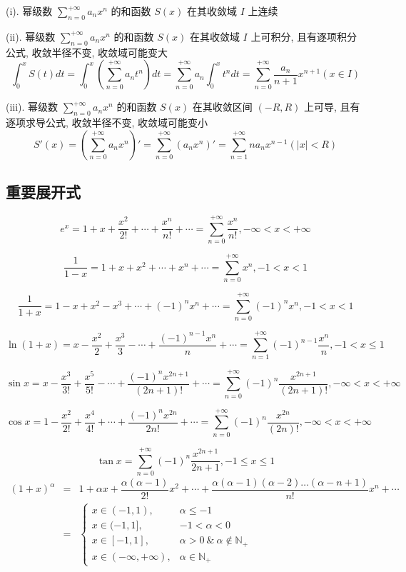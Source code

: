 \begin{corollary}
	
	(i). 幂级数 $\sum\limits_{n=0}^{+\infty}a_{n}x^{n}$ 的和函数 $S(x)$ 在其收敛域 $I$ 上连续

	(ii). 幂级数 $\sum\limits_{n=0}^{+\infty}a_{n}x^{n}$ 的和函数 $S(x)$ 在其收敛域 $I$ 上可积分, 且有逐项积分公式, 收敛半径不变, 收敛域可能变大 
	$$\int_{0}^{x}S(t)dt = \int_{0}^{x}\left(\sum\limits_{n=0}^{+\infty}a_{n}t^{n}\right)dt = \sum\limits_{n=0}^{+\infty}a_{n}\int_{0}^{x}t^{n}dt = \sum\limits_{n=0}^{+\infty}\dfrac{a_{n}}{n+1}x^{n+1}(x\in I)$$
	
	(iii). 幂级数 $\sum\limits_{n=0}^{+\infty}a_{n}x^{n}$ 的和函数 $S(x)$ 在其收敛区间 $(-R,R)$ 上可导, 且有逐项求导公式, 收敛半径不变, 收敛域可能变小 
	$$S'(x) = \left(\sum\limits_{n=0}^{+\infty}a_{n}x^{n}\right)' = \sum\limits_{n=0}^{+\infty}\left(a_{n}x^{n}\right)' = \sum\limits_{n=1}^{+\infty}na_{n}x^{n-1}(|x| < R)$$
\end{corollary}

\subsection{重要展开式}

\begin{theorem}\label{the: 重要幂级数展开式}
	$$e^{x}=1+x+\dfrac{x^2}{2!}+\cdots+\dfrac{x^n}{n!}+\cdots = 
	\sum\limits_{n=0}^{+\infty}\dfrac{x^{n}}{n!}, -\infty<x<+\infty$$

	$$\dfrac{1}{1-x}=1+x+x^2+\cdots+x^{n}+\cdots = 
	\sum\limits_{n=0}^{+\infty}x^{n}, -1<x<1$$

	$$\dfrac{1}{1+x}=1-x+x^2-x^3+\cdots+(-1)^{n}x^{n}+\cdots = 
	\sum\limits_{n=0}^{+\infty}(-1)^{n}x^{n},-1<x<1$$

	$$\ln(1+x)=x-\dfrac{x^2}{2}+\dfrac{x^3}{3}-\cdots + \dfrac{(-1)^{n-1}x^{n}}{n}+\cdots
	= \sum\limits_{n=1}^{+\infty}(-1)^{n-1}\dfrac{x^{n}}{n},-1<x\leq 1$$
	
	$$\sin x=x-\dfrac{x^3}{3!}+\dfrac{x^5}{5!}-\cdots+\dfrac{(-1)^{n}x^{2n+1}}{(2n+1)!}+\cdots=\sum\limits_{n=0}^{+\infty}(-1)^{n}\dfrac{x^{2n+1}}{(2n+1)!}, -\infty<x<+\infty$$
	
	$$\cos x=1-\dfrac{x^2}{2!}+\dfrac{x^4}{4!}+\cdots+\dfrac{(-1)^nx^{2n}}{2n!}+\cdots=\sum\limits_{n=0}^{+\infty}(-1)^{n}\dfrac{x^{2n}}{(2n)!}, -\infty<x<+\infty$$
	
	$$\tan x=\sum\limits_{n=0}^{+\infty}(-1)^{n}\dfrac{x^{2n+1}}{2n+1}, -1\leq x\leq 1 $$
	\begin{eqnarray*}
		(1+x)^{\alpha} & = & 1+\alpha x+\dfrac{\alpha (\alpha-1)}{2!}x^2+ \cdots + \dfrac{\alpha (\alpha-1)(\alpha-2)\dots(\alpha-n+1)}{n!}x^n+\cdots\\
		               & = & \begin{cases}
						 x\in (-1,1), & \alpha \leq -1\\
						 x\in (-1,1], & -1 < \alpha < 0\\
						 x\in [-1,1], & \alpha > 0\ \&\ \alpha \notin \mathbb{N}_{+}\\
						 x\in (-\infty,+\infty), & \alpha \in \mathbb{N}_{+}  
					   \end{cases}
	\end{eqnarray*}
\end{theorem}
